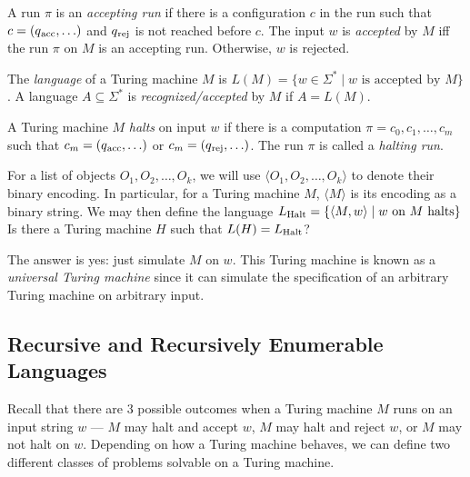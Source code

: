 \documentclass[11pt,usenames, dvipsnames]{article}
\begin{document}
\begin{definition}
  A run $\pi$ is an \emph{accepting run} if there is a configuration $c$ in the run such that $c = (q\textsubscript{acc}, \ldots)$ and $q\textsubscript{rej}$ is not reached before $c$. The input $w$ is \emph{accepted} by $M$ iff the run $\pi$ on $M$ is an accepting run. Otherwise, $w$ is rejected.
\end{definition}

\begin{definition}
  The \emph{language} of a Turing machine $M$ is $L(M) = \{w \in \Sigma^* \mid w \text{ is accepted by $M$}\}$. A language $A \subseteq \Sigma^*$ is \emph{recognized/accepted} by $M$ if $A = L(M)$.
\end{definition}

\begin{definition}[Halting]
  A Turing machine $M$ \emph{halts} on input $w$ if there is a computation $\pi = c_0, c_1, \ldots, c_m$ such that $c_m = (q\textsubscript{acc}, \ldots)$ or $c_m = (q\textsubscript{rej}, \ldots)$. The run $\pi$ is called a \emph{halting run}.
\end{definition}

For a list of objects $O_1, O_2, \ldots, O_k$, we will use $\langle O_1, O_2, \ldots, O_k \rangle$ to denote their binary encoding. In particular, for a Turing machine $M$, $\langle M \rangle$ is its encoding as a binary string. We may then define the language $L\textsubscript{Halt} = \{\langle M, w \rangle \mid w \text{ on } M \text{ halts}\}$ Is there a Turing machine $H$ such that $L(H) = L\textsubscript{Halt}$?

The answer is yes: just simulate $M$ on $w$. This Turing machine is known as a \emph{universal Turing machine} since it can simulate the specification of an arbitrary Turing machine on arbitrary input.

\subsection{\large \centering Recursive and Recursively Enumerable Languages}
\noindent

Recall that there are $3$ possible outcomes when a Turing machine $M$ runs on an input string $w$ --- $M$ may halt and accept $w$, $M$ may halt and reject $w$, or $M$ may not halt on $w$. Depending on how a Turing machine behaves,  we can define two different classes of problems solvable on a Turing machine.
\end{document}
